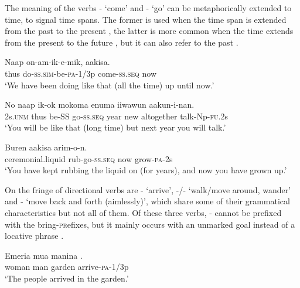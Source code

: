 The meaning of the verbs - `come' and - `go' can be metaphorically extended to time, to signal time spans. The former is used when the time span is extended from the past to the present , the latter is more common when the time extends from the present to the future , but it can also refer to the past .

\ea%
\label{ex:3:x290}
\gll Naap on-am-ik-e-mik,   aakisa. \\
thus do-\textsc{ss}.\textsc{sim}-be-\textsc{pa}-1/3p come-\textsc{ss}.\textsc{seq} now\\
\glt`We have been doing like that (all the time) up until now.'
\z

\ea%
\label{ex:3:x437}
\gll No naap ik-ok  mokoma enuma iiwawun aakun-i-nan.\\
2s.\textsc{unm} thus be-SS go-\textsc{ss}.\textsc{seq} year new altogether talk-Np-\textsc{fu}.2s\\
\glt`You will be like that (long time) but next year you will talk.'
\z

\ea%
\label{ex:3:x291}
\gll Buren \textstyleEmphasizedVernacularWords{(}\textstyleEmphasizedVernacularWords{)} aakisa arim-o-n. \\
ceremonial.liquid rub-go-\textsc{ss}.\textsc{seq} now grow-\textsc{pa}-2s \\
\glt`You have kept rubbing the \textit{} liquid on (for years), and now you have grown up.'
\z

On the fringe of directional verbs are - `arrive', -/- `walk/move around, wander' and - `move back and forth (aimlessly)', which share some of their grammatical characteristics but not all of them. Of these three verbs, - cannot be prefixed with the bring-\textsc{pr}efixes, but it mainly occurs with an unmarked goal instead of a locative phrase .

\ea%
\label{ex:3:x292}
\gll Emeria mua manina . \\
woman man garden arrive-\textsc{pa}-1/3p \\
\glt`The people arrived in the garden.'
\z

